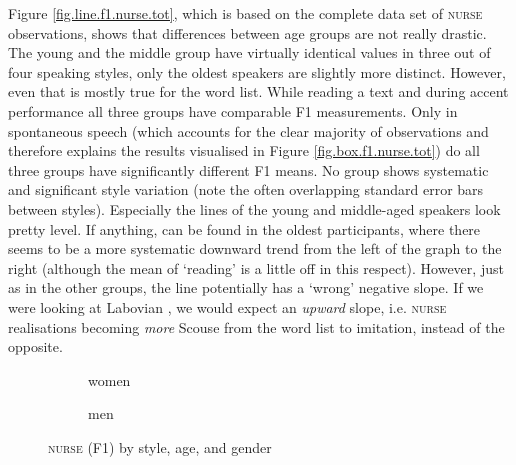 Figure \ref{fig.line.f1.nurse.tot}, which is based on the complete data set of \textsc{nurse} observations, shows that differences between age groups are not really drastic.
The young and the middle group have virtually identical values in three out of four speaking styles, only the oldest speakers are slightly more distinct.
However, even that is mostly true for the word list.
While reading a text and during accent performance all three groups have comparable F1 measurements.
Only in spontaneous speech (which accounts for the clear majority of observations and therefore explains the results visualised in Figure \ref{fig.box.f1.nurse.tot}) do all three groups have significantly different F1 means.
No group shows systematic and significant style variation (note the often overlapping standard error bars between styles).
Especially the lines of the young and middle-aged speakers look pretty level.
If anything,  can be found in the oldest participants, where there seems to be a more systematic downward trend from the left of the graph to the right (although the mean of `reading' is a little off in this respect).
However, just as in the other groups, the line potentially has a `wrong' negative slope.
If we were looking at Labovian , we would expect an \emph{upward} slope, i.e. \textsc{nurse} realisations becoming \emph{more} Scouse from the word list to imitation, instead of the opposite.

\begin{figure}[h!]
	\centering
	\begin{subfigure}{.49\textwidth}
		\centering
			\resizebox{\linewidth}{!}{} 
		\caption{women}
		\label{fig.line.f1.nurse.women}
	\end{subfigure}
	\begin{subfigure}{.49\textwidth}
		\centering
			\resizebox{\linewidth}{!}{} 
		\caption{men}
		\label{fig.line.f1.nurse.men}
	\end{subfigure}
	\caption{\textsc{nurse} (F1) by style, age, and gender}
\end{figure}

